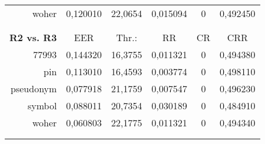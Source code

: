 \begin{table}[htbp]
\begin{tabular}{rrrrrr}
    woher & \multicolumn{1}{c}{0,120010} & \multicolumn{1}{c}{22,0654} & \multicolumn{1}{c}{0,015094} & \multicolumn{1}{c}{0} & \multicolumn{1}{c}{0,492450} \\
          &       &       &       &       &  \\
          &       &       &       &       &  \\
    \textbf{R2 vs. R3} & \multicolumn{1}{c}{EER} & \multicolumn{1}{c}{Thr.:} & \multicolumn{1}{c}{RR} & \multicolumn{1}{c}{CR} & \multicolumn{1}{c}{CRR} \\
    77993 & \multicolumn{1}{c}{0,144320} & \multicolumn{1}{c}{16,3755} & \multicolumn{1}{c}{0,011321} & \multicolumn{1}{c}{0} & \multicolumn{1}{c}{0,494380} \\
    pin   & \multicolumn{1}{c}{0,113010} & \multicolumn{1}{c}{16,4593} & \multicolumn{1}{c}{0,003774} & \multicolumn{1}{c}{0} & \multicolumn{1}{c}{0,498110} \\
    pseudonym & \multicolumn{1}{c}{0,077918} & \multicolumn{1}{c}{21,1759} & \multicolumn{1}{c}{0,007547} & \multicolumn{1}{c}{0} & \multicolumn{1}{c}{0,496230} \\
    symbol & \multicolumn{1}{c}{0,088011} & \multicolumn{1}{c}{20,7354} & \multicolumn{1}{c}{0,030189} & \multicolumn{1}{c}{0} & \multicolumn{1}{c}{0,484910} \\
    woher & \multicolumn{1}{c}{0,060803} & \multicolumn{1}{c}{22,1775} & \multicolumn{1}{c}{0,011321} & \multicolumn{1}{c}{0} & \multicolumn{1}{c}{0,494340} \\
          &       &       &       &       &  \\
          &       &       &       &       &  \\
    \bottomrule
    \end{tabular}%
  \label{tab:referenz}%
\end{table}%

